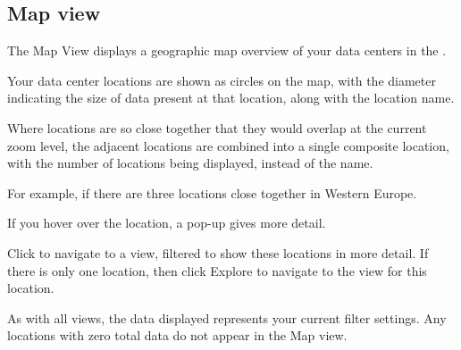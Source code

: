 \documentclass[letterpaper,10pt,english]{sphinxmanual}
\begin{document}
\subsection{Map view}
\label{\detokenize{mcdmp_app_ug:map-view}}
The Map View displays a geographic map overview of your data centers in the .
\begin{quote}

\begin{figure}[htbp]
\centering

\noindent{}
\end{figure}
\end{quote}


Your data center locations are shown as circles on the map, with the diameter indicating the size of data present at that location, along with the location name.

Where locations are so close together that they would overlap at the current zoom level, the adjacent locations are combined into a single composite location, with the number of locations being displayed, instead of the name.

For example, if there are three locations close together in Western Europe.
\begin{quote}

\begin{figure}[htbp]
\centering

\noindent{}
\end{figure}
\end{quote}

If you hover over the location, a pop-up gives more detail.
\begin{quote}

\begin{figure}[htbp]
\centering

\noindent{}
\end{figure}
\end{quote}

Click  to navigate to a  view, filtered to show these locations in more detail. If there is only one location, then click Explore to navigate to the  view for this location.

As with all views, the data displayed represents your current filter settings. Any locations with zero total data do not appear in the Map view.
\end{document}
